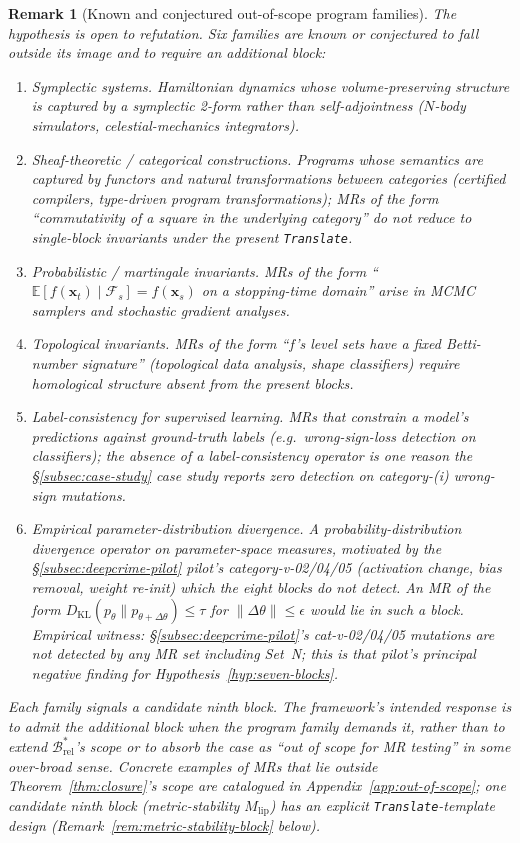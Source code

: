 \documentclass[acmsmall, screen]{acmart}
\newtheorem{remark}{Remark}
\begin{document}
\begin{remark}[Known and conjectured out-of-scope program families]
\label{rem:counterex}
The hypothesis is open to refutation. Six families are known or conjectured to fall outside its image and to require an additional block:
\begin{enumerate}
\item \emph{Symplectic systems.} Hamiltonian dynamics whose volume-preserving structure is captured by a symplectic 2-form rather than self-adjointness ($N$-body simulators, celestial-mechanics integrators).
\item \emph{Sheaf-theoretic / categorical constructions.} Programs whose semantics are captured by functors and natural transformations between categories (certified compilers, type-driven program transformations); MRs of the form ``commutativity of a square in the underlying category'' do not reduce to single-block invariants under the present \texttt{Translate}.
\item \emph{Probabilistic / martingale invariants.} MRs of the form ``$\mathbb{E}[f(\mathbf{x}_t) \mid \mathcal{F}_s] = f(\mathbf{x}_s)$ on a stopping-time domain'' arise in MCMC samplers and stochastic gradient analyses.
\item \emph{Topological invariants.} MRs of the form ``$f$'s level sets have a fixed Betti-number signature'' (topological data analysis, shape classifiers) require homological structure absent from the present blocks.
\item \emph{Label-consistency for supervised learning.} MRs that constrain a model's predictions against ground-truth labels (e.g.\ wrong-sign-loss detection on classifiers); the absence of a label-consistency operator is one reason the §\ref{subsec:case-study} case study reports zero detection on category-(i) wrong-sign mutations.
\item \emph{Empirical parameter-distribution divergence.} A probability-distribution divergence operator on parameter-space measures, motivated by the §\ref{subsec:deepcrime-pilot} pilot's category-v-02/04/05 (activation change, bias removal, weight re-init) which the eight blocks do not detect. An MR of the form $D_{\mathrm{KL}}(p_\theta \| p_{\theta+\Delta\theta}) \le \tau$ for $\|\Delta\theta\| \le \epsilon$ would lie in such a block. \emph{Empirical witness}: \S\ref{subsec:deepcrime-pilot}'s cat-v-02/04/05 mutations are not detected by any MR set including Set~N; this is that pilot's principal negative finding for Hypothesis~\ref{hyp:seven-blocks}.
\end{enumerate}
Each family signals a candidate ninth block. The framework's intended response is to admit the additional block when the program family demands it, rather than to extend $\mathcal{B}^{*}_{\mathrm{rel}}$'s scope or to absorb the case as ``out of scope for MR testing'' in some over-broad sense. Concrete examples of MRs that lie outside Theorem~\ref{thm:closure}'s scope are catalogued in Appendix~\ref{app:out-of-scope}; one candidate ninth block (metric-stability $M_{\mathrm{lip}}$) has an explicit \texttt{Translate}-template design (Remark~\ref{rem:metric-stability-block} below).
\end{remark}
\end{document}
